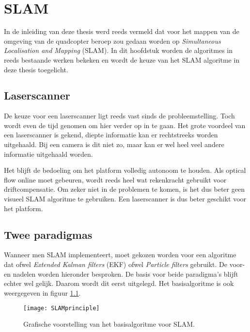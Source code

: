 \chapter{SLAM}\label{sec:SLAM}
In de inleiding van deze thesis werd reeds vermeld dat voor het mappen van de omgeving van de quadcopter beroep zou gedaan worden op \textit{Simultaneous Localisation and Mapping} (SLAM). In dit hoofdstuk worden de algoritmes in reeds bestaande werken bekeken en wordt de keuze van het SLAM algoritme in deze thesis toegelicht.

\section{Laserscanner}
De keuze voor een laserscanner ligt reeds vast sinds de probleemstelling. Toch wordt even de tijd genomen om hier verder op in te gaan. Het grote voordeel van een laserscanner is gekend, diepte informatie kan er rechtstreeks worden uitgehaald. Bij een camera is dit niet zo, maar kan er wel heel veel andere informatie uitgehaald worden.

\npar Het blijft de bedoeling om het platform volledig autonoom te houden. Als optical flow online moet gebeuren, wordt reeds heel wat rekenkracht gebruikt voor driftcompensatie. Om zeker niet in de problemen te komen, is het dus beter geen visueel SLAM algoritme te gebruiken. Een laserscanner is dus beter geschikt voor het platform.


\section{Twee paradigmas}
Wanneer men SLAM implementeert, moet gekozen worden voor een algoritme dat ofwel \textit{Extended Kalman filters} (EKF) ofwel \textit{Particle filters} gebruikt. De voor- en nadelen worden hieronder besproken. De basis voor beide paradigma's blijft echter wel gelijk. Daarom wordt dit eerst uitgelegd. Het basisalgoritme is ook weergegeven in figuur \ref{fig:SLAMprin}.

\begin{figure}
	\centering
	\texttt{[image: SLAMprinciple]}
	\caption{Grafische voorstelling van het basisalgoritme voor SLAM.} \label{fig:SLAMprin}
\end{figure}

